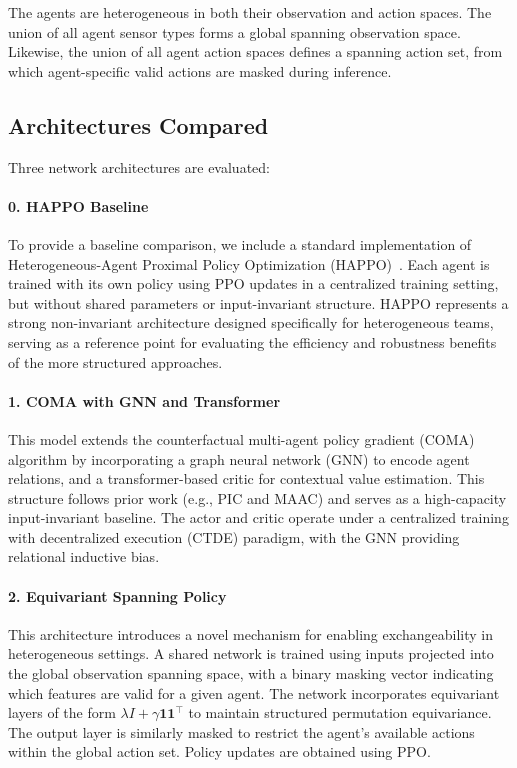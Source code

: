\documentclass{article}
\begin{document}
The agents are heterogeneous in both their observation and action spaces. 
The union of all agent sensor types forms a global spanning observation space. 
Likewise, the union of all agent action spaces defines a spanning action set, 
from which agent-specific valid actions are masked during inference.

\subsection{Architectures Compared}
Three network architectures are evaluated:

\paragraph{0. HAPPO Baseline}
To provide a baseline comparison, we include a standard implementation 
of Heterogeneous-Agent Proximal Policy Optimization (HAPPO)~\cite{zhong2024}. 
Each agent is trained with its own policy using PPO updates in a centralized 
training setting, but without shared parameters or input-invariant structure. 
HAPPO represents a strong non-invariant architecture designed specifically 
for heterogeneous teams, serving as a reference point for evaluating the 
efficiency and robustness benefits of the more structured approaches.

\paragraph{1. COMA with GNN and Transformer}
This model extends the counterfactual multi-agent policy gradient (COMA) 
algorithm by incorporating a graph neural network (GNN) to encode agent relations, 
and a transformer-based critic for contextual value estimation. 
This structure follows prior work (e.g., PIC and MAAC) and 
serves as a high-capacity input-invariant baseline. 
The actor and critic operate under a centralized training with 
decentralized execution (CTDE) paradigm, with the GNN providing relational inductive bias.

\paragraph{2. Equivariant Spanning Policy}
This architecture introduces a novel mechanism for enabling 
exchangeability in heterogeneous settings. A shared network 
is trained using inputs projected into the global observation 
spanning space, with a binary masking vector indicating which 
features are valid for a given agent. The network incorporates 
equivariant layers of the form $\lambda I + \gamma \mathbf{11}^\top$ 
to maintain structured permutation equivariance. The output layer 
is similarly masked to restrict the agent's available actions 
within the global action set. Policy updates are obtained using PPO.
\end{document}
